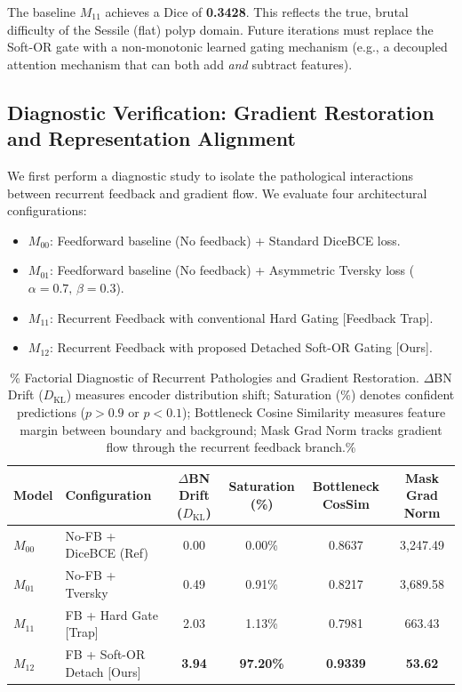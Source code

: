 The baseline $M_{11}$ achieves a Dice of \textbf{0.3428}. This reflects the true, brutal difficulty of the Sessile (flat) polyp domain. Future iterations must replace the Soft-OR gate with a non-monotonic learned gating mechanism (e.g., a decoupled attention mechanism that can both add \textit{and} subtract features).


\subsection{Diagnostic Verification: Gradient Restoration and Representation Alignment}
We first perform a diagnostic study to isolate the pathological interactions
between recurrent feedback and gradient flow. We evaluate four architectural
configurations:
\begin{itemize}
  \item $M_{00}$: Feedforward baseline (No feedback) + Standard DiceBCE loss.
  \item $M_{01}$: Feedforward baseline (No feedback) + Asymmetric Tversky loss ($\alpha=0.7,\,\beta=0.3$).
  \item $M_{11}$: Recurrent Feedback with conventional Hard Gating [Feedback Trap].
  \item $M_{12}$: Recurrent Feedback with proposed Detached Soft-OR Gating [Ours].
\end{itemize}

\begin{table}[t!]
\centering
\caption{\%
  Factorial Diagnostic of Recurrent Pathologies and Gradient
  Restoration. $\Delta$BN Drift ($D_{\text{KL}}$) measures encoder
  distribution shift; Saturation (\%) denotes confident predictions
  ($p > 0.9$ or $p < 0.1$); Bottleneck Cosine Similarity measures
  feature margin between boundary and background; Mask Grad Norm
  tracks gradient flow through the recurrent feedback branch.\%
}
\label{tab:diagnostic}
\begin{tabularx}{\textwidth}{l l c c c c}
\toprule
\textbf{Model} & \textbf{Configuration}
  & \textbf{$\Delta$BN Drift ($D_{\text{KL}}$)}
  & \textbf{Saturation (\%)}
  & \textbf{Bottleneck CosSim}
  & \textbf{Mask Grad Norm} \\
\midrule
$M_{00}$ & No-FB + DiceBCE (Ref)      & 0.00          & 0.00\%           & 0.8637          & 3{,}247.49      \\
$M_{01}$ & No-FB + Tversky            & 0.49          & 0.91\%           & 0.8217          & 3{,}689.58      \\
$M_{11}$ & FB + Hard Gate [Trap]      & 2.03          & 1.13\%           & 0.7981          &   663.43        \\
$M_{12}$ & FB + Soft-OR Detach [Ours] & \textbf{3.94} & \textbf{97.20\%} & \textbf{0.9339} & \textbf{53.62}  \\
\bottomrule
\end{tabularx}
\end{table}

